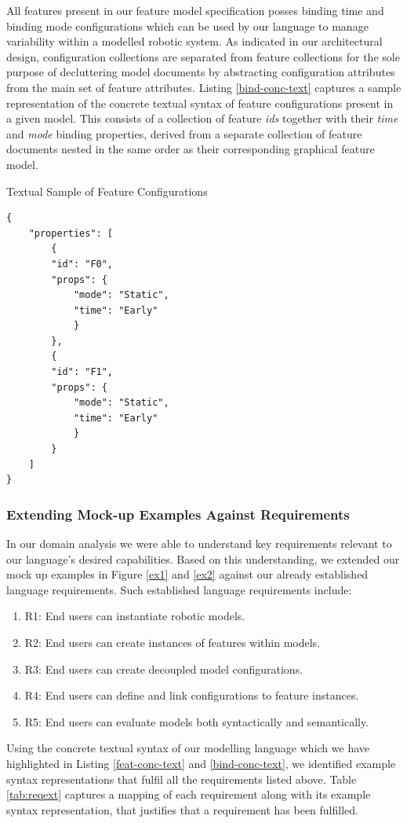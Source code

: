 \documentclass[conference]{IEEEtran}
\begin{document}
All features present in our feature model specification posses binding time and binding mode configurations which can be used by our language to manage variability within a modelled robotic system. As indicated in our architectural design, configuration collections are separated from feature collections for the sole purpose of decluttering model documents by abstracting configuration attributes from the main set of feature attributes. Listing
\ref{bind-conc-text} captures a sample representation of the concrete textual syntax of feature configurations present in a given model. This consists of a collection of feature \textit{ids} together with their \textit{time} and \textit{mode} binding properties, derived from a separate collection of feature documents nested in the same order as their corresponding graphical feature model.

\begin{listing}[H]
\caption{Textual Sample of Feature Configurations}
\begin{verbatim}
{
	"properties": [
	    {
	    "id": "F0",
	    "props": {
	        "mode": "Static",
	        "time": "Early"
	    	}
	    },
	    {
	    "id": "F1",
	    "props": {
	        "mode": "Static",
	        "time": "Early"
	    	}
	    }
	]
}
\end{verbatim}
\label{bind-conc-text}
\end{listing}

\subsubsection{Extending Mock-up Examples Against Requirements}
In our domain analysis we were able to understand key requirements relevant to our language's desired capabilities. Based on this understanding, we extended our mock up examples in Figure \ref{ex1} and \ref{ex2} against our already established language requirements. Such established language requirements include:
\begin{enumerate}
    \item R1: End users can instantiate robotic models.
    \item R2: End users can create instances of features within models.
    \item R3: End users can create decoupled model configurations.
    \item R4: End users can define and link configurations to feature instances.
    \item R5: End users can evaluate models both syntactically and semantically.
\end{enumerate}
Using the concrete textual syntax of our modelling language which we have highlighted in Listing \ref{feat-conc-text} and \ref{bind-conc-text}, we identified example syntax representations that fulfil all the requirements listed above. Table \ref{tab:reqext} captures a mapping of each requirement along with its example syntax representation, that justifies that a requirement has been fulfilled.
\end{document}
